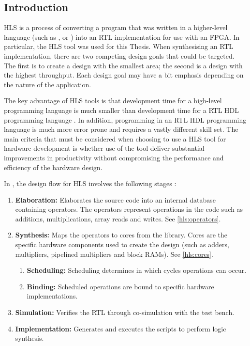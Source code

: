 \subsection{Introduction}
\label{hls:introduction}
\nocite{Xilinx:Tutorial}
\gls{HLS} is a process of converting a program that was written in a
higher-level language (such as ,
 or ) into an \gls{RTL}
implementation for use with an \gls{FPGA}. In particular, the \gls{HLS} tool
 was used for this Thesis. When synthesising an \gls{RTL}
implementation, there are two competing design goals that could be targeted. The
first is to create a design with the smallest area; the second is a design with
the highest throughput. Each design goal may have a bit emphasis depending on
the nature of the application.

The key advantage of \gls{HLS} tools is that development time for a high-level
programming language is much smaller than development time for a \gls{RTL}
\gls{HDL} programming language \cite{Berkeley:2010}. In addition, programming in
an \gls{RTL} \gls{HDL} programming language is much more error prone and
requires a vastly different skill set. The main criteria that must be considered
when choosing to use a \gls{HLS} tool for hardware development is whether use of
the tool deliver substantial improvements in productivity without compromising
the performance and efficiency of the hardware design.

In , the design flow for \gls{HLS} involves the following
stages \cite{Xilinx:Tutorial}:
\begin{enumerate}
    \item \textbf{Elaboration:} Elaborates the source code into an internal
        database containing operators. The operators represent operations in the
         code such as additions, multiplications, array
        reads and writes. See \autoref{hls:operators}.
    \item \textbf{Synthesis:} Maps the operators to cores from the
         library. Cores are the specific hardware components
        used to create the design (such as adders, multipliers, pipelined
        multipliers and block \glspl{RAM}). See \autoref{hls:cores}.
    \begin{enumerate}
        \item \textbf{Scheduling:} Scheduling determines in which cycles
            operations can occur.
        \item \textbf{Binding:} Scheduled operations are bound to specific
            hardware implementations.
    \end{enumerate}
    \item \textbf{Simulation:} Verifies the \gls{RTL} through co-simulation with
        the  test bench.
    \item \textbf{Implementation:} Generates and executes the scripts to perform
        logic synthesis.
\end{enumerate}

